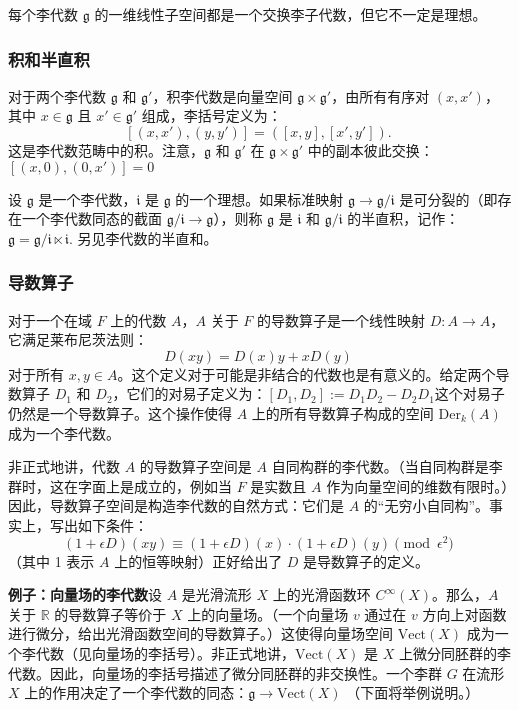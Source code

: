 每个李代数 \( \mathfrak{g} \) 的一维线性子空间都是一个交换李子代数，但它不一定是理想。
\subsubsection{积和半直积}  
对于两个李代数 \( \mathfrak{g} \) 和 \( \mathfrak{g'} \)，积李代数是向量空间 \( \mathfrak{g} \times \mathfrak{g'} \)，由所有有序对 \( (x, x') \)，其中 \( x \in \mathfrak{g} \) 且 \( x' \in \mathfrak{g'} \) 组成，李括号定义为：
\[
[(x,x'),(y,y')] = ([x,y], [x',y']).~
\]
这是李代数范畴中的积。注意，\( \mathfrak{g} \) 和 \( \mathfrak{g'} \) 在 \( \mathfrak{g} \times \mathfrak{g'} \) 中的副本彼此交换：\([(x,0),(0,x')] =0\)

设 \( \mathfrak{g} \) 是一个李代数，\( \mathfrak{i} \) 是 \( \mathfrak{g} \) 的一个理想。如果标准映射 \( \mathfrak{g} \to \mathfrak{g}/\mathfrak{i} \) 是可分裂的（即存在一个李代数同态的截面 \( \mathfrak{g}/\mathfrak{i} \to \mathfrak{g} \)），则称 \( \mathfrak{g} \) 是 \( \mathfrak{i} \) 和 \( \mathfrak{g}/\mathfrak{i} \) 的半直积，记作：\(\mathfrak{g} = \mathfrak{g}/\mathfrak{i} \ltimes \mathfrak{i}.\)
另见李代数的半直和。
\subsubsection{导数算子}  
对于一个在域 \( F \) 上的代数 \( A \)，\( A \) 关于 \( F \) 的导数算子是一个线性映射 \( D \colon A \to A \)，它满足莱布尼茨法则：
\[
D(xy) = D(x)y + xD(y)~
\]
对于所有 \( x, y \in A \)。这个定义对于可能是非结合的代数也是有意义的。给定两个导数算子 \( D_1 \) 和 \( D_2 \)，它们的对易子定义为：\([D_1, D_2] := D_1D_2 - D_2D_1\)这个对易子仍然是一个导数算子。这个操作使得 \( A \) 上的所有导数算子构成的空间 \( \text{Der}_k(A) \) 成为一个李代数。

非正式地讲，代数 \( A \) 的导数算子空间是 \( A \) 自同构群的李代数。（当自同构群是李群时，这在字面上是成立的，例如当 \( F \) 是实数且 \( A \) 作为向量空间的维数有限时。）因此，导数算子空间是构造李代数的自然方式：它们是 \( A \) 的“无穷小自同构”。事实上，写出如下条件：
\[
(1 + \epsilon D)(xy) \equiv (1 + \epsilon D)(x) \cdot (1 + \epsilon D)(y) \pmod{\epsilon^2}~
\]
（其中 1 表示 \( A \) 上的恒等映射）正好给出了 \( D \) 是导数算子的定义。

\textbf{例子：向量场的李代数}设 \( A \) 是光滑流形 \( X \) 上的光滑函数环 \( C^{\infty}(X) \)。那么，\( A \) 关于 \( \mathbb{R} \) 的导数算子等价于 \( X \) 上的向量场。（一个向量场 \( v \) 通过在 \( v \) 方向上对函数进行微分，给出光滑函数空间的导数算子。）这使得向量场空间 \( \text{Vect}(X) \) 成为一个李代数（见向量场的李括号）。非正式地讲，\( \text{Vect}(X) \) 是 \( X \) 上微分同胚群的李代数。因此，向量场的李括号描述了微分同胚群的非交换性。一个李群 \( G \) 在流形 \( X \) 上的作用决定了一个李代数的同态：\(\mathfrak{g} \to \text{Vect}(X)\)
（下面将举例说明。）

